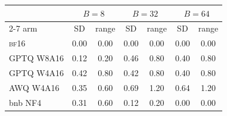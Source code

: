 \begin{tabular}{lcccccc}
\toprule
& \multicolumn{2}{c}{$B=8$} & \multicolumn{2}{c}{$B=32$} & \multicolumn{2}{c}{$B=64$} \\
\cmidrule(lr){2-7}
arm & SD & range & SD & range & SD & range \\
\midrule
\textsc{bf16} & 0.00 & 0.00 & 0.00 & 0.00 & 0.00 & 0.00 \\
GPTQ W8A16 & 0.12 & 0.20 & 0.46 & 0.80 & 0.40 & 0.80 \\
GPTQ W4A16 & 0.42 & 0.80 & 0.42 & 0.80 & 0.40 & 0.80 \\
AWQ W4A16 & 0.35 & 0.60 & 0.69 & 1.20 & 0.64 & 1.20 \\
bnb NF4 & 0.31 & 0.60 & 0.12 & 0.20 & 0.00 & 0.00 \\
\bottomrule
\end{tabular}
